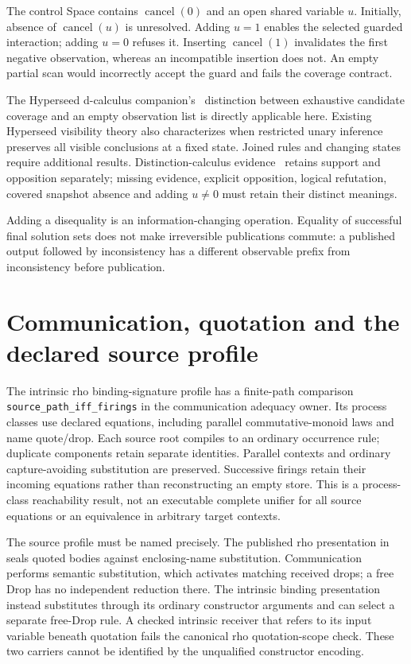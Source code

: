 \documentclass[11pt]{article}
\newcommand{\code}[1]{\texttt{\small #1}}
\begin{document}
The control Space contains $\operatorname{cancel}(0)$ and an open shared
variable $u$. Initially, absence of $\operatorname{cancel}(u)$ is unresolved.
Adding $u=1$ enables the selected guarded interaction; adding $u=0$ refuses
it. Inserting $\operatorname{cancel}(1)$ invalidates the first negative
observation, whereas an incompatible insertion does not. An empty partial
scan would incorrectly accept the guard and fails the coverage contract.

The Hyperseed d-calculus companion's~\cite{hyperseed} distinction between exhaustive
candidate coverage and an empty observation list is directly applicable
here. Existing Hyperseed visibility theory also characterizes when
restricted unary inference preserves all visible conclusions at a fixed
state. Joined rules and changing states require additional results.
Distinction-calculus evidence~\cite{dcalc} retains support and opposition separately;
missing evidence, explicit opposition, logical refutation, covered snapshot
absence and adding $u\ne0$ must retain their distinct meanings.

Adding a disequality is an information-changing operation. Equality of
successful final solution sets does not make irreversible publications
commute: a published output followed by inconsistency has a different
observable prefix from inconsistency before publication.

\section{Communication, quotation and the declared source profile}

The intrinsic rho binding-signature profile has a finite-path comparison
\code{source\_path\_iff\_firings} in the communication adequacy owner. Its
process classes use declared equations, including parallel commutative-monoid
laws and name quote/drop. Each source root compiles to an ordinary occurrence
rule; duplicate components retain separate identities. Parallel contexts
and ordinary capture-avoiding substitution are preserved. Successive firings
retain their incoming equations rather than reconstructing an empty store.
This is a process-class reachability result, not an executable complete
unifier for all source equations or an equivalence in arbitrary target contexts.

The source profile must be named precisely. The published rho presentation
in~\cite{lybech} seals quoted bodies against enclosing-name substitution.
Communication performs semantic substitution, which activates matching
received drops; a free Drop has no independent reduction there. The
intrinsic binding presentation instead substitutes through its ordinary
constructor arguments and can select a separate free-Drop rule. A checked
intrinsic receiver that refers to its input variable beneath quotation fails
the canonical rho quotation-scope check. These two carriers cannot be
identified by the unqualified constructor encoding.
\end{document}
